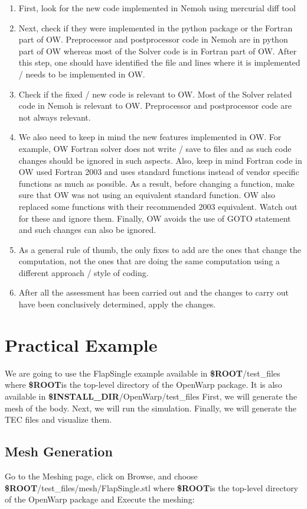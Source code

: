 \documentclass[12pt]{article}
\newcommand{\ROOT}{{\textbf{\$ROOT}}}
\newcommand{\INSTALLDIR}{{\textbf{\$INSTALL{\_}DIR}}}
\begin{document}
\begin{enumerate}
\item First, look for the new code implemented in Nemoh using mercurial diff tool
\item Next, check if they were implemented in the python package or the Fortran part of OW. Preprocessor and postprocessor code in Nemoh are in python part of OW whereas most of the Solver code is in Fortran part of OW. After this step, one should have identified the file and lines where it is implemented / needs to be implemented in OW.
\item Check if the fixed / new code is relevant to OW. Most of the Solver related code in Nemoh is relevant to OW. Preprocessor and postprocessor code are not always relevant.
\item We also need to keep in mind the new features implemented in OW. For example, OW Fortran solver does not write / save to files and as such code changes should be ignored in such aspects. Also, keep in mind Fortran code in OW used Fortran 2003 and uses standard functions instead of vendor specific functions as much as possible. As a result, before changing a function, make sure that OW was not using an equivalent standard function. OW also replaced some functions with their recommended 2003 equivalent. Watch out for these and ignore them. Finally, OW avoids the use of GOTO statement and such changes can also be ignored.
\item As a general rule of thumb, the only fixes to add are the ones that change the computation, not the ones that are doing the same computation using a different approach / style of coding.
\item After all the assessment has been carried out and the changes to carry out have been conclusively determined, apply the changes.
\end{enumerate}


\section{Practical Example}

We are going to use the FlapSingle example available in \ROOT/test_files where \ROOT is the top-level directory of the OpenWarp package. It is also available in \INSTALLDIR/OpenWarp/test_files
First, we will generate the mesh of the body. Next, we will run the simulation. Finally, we will generate the TEC files and visualize them.

\subsection{Mesh Generation}
Go to the Meshing page, click on Browse, and choose \ROOT/test_files/mesh/FlapSingle.stl where \ROOT is the top-level directory of the OpenWarp package and Execute the meshing:
\end{document}

